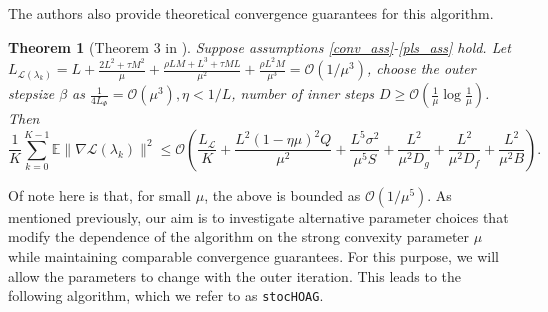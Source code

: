 \documentclass[11pt, twoside]{report}
\newtheorem{theorem}{Theorem}[section]
\begin{document}
\begin{algorithm}[]
\caption{\texttt{stocBio} \cite{ji2021bilevel}}
\label{alg:stocbio}
\DontPrintSemicolon
{}
\end{algorithm}


The authors also provide theoretical convergence guarantees for this algorithm.
\begin{theorem}[Theorem 3 in \cite{ji2021bilevel}] \label{thm3}
    Suppose assumptions \ref{conv_ass}-\ref{pls_ass} hold. Let $L_{\mathcal{L}(\lambda_k)} = L + \frac{2L^2 + \tau M^2}{\mu} + \frac{\rho L M + L^3 + \tau M L}{\mu^2} + \frac{\rho L^2 M}{\mu^3} = \mathcal{O}(1/\mu^3)$, choose the outer stepsize $\beta$ as $\frac{1}{4 L_\Phi} = \mathcal{O}(\mu^3), \eta < 1/L$, number of inner steps $D \geq \mathcal{O}(\frac{1}{\mu} \log{\frac{1}{\mu}})$. Then
    \[\frac{1}{K} \sum_{k=0}^{K-1} \mathbb{E} \|\nabla \mathcal{L}(\lambda_k)\|^2 \leq \mathcal{O}\left( \frac{L_{\mathcal{L}}}{K} + \frac{L^2(1-\eta \mu)^2Q}{\mu^2} + \frac{L^5 \sigma^2}{\mu^5 S} + \frac{L^2}{\mu^2 D_g} + \frac{L^2}{\mu^2 D_f} + \frac{L^2}{
    \mu^2 B} \right).\]
    
\end{theorem}
Of note here is that, for small $\mu$, the above is bounded as $\mathcal{O}(1/\mu^5)$. As mentioned previously, our aim is to investigate alternative parameter choices that modify the dependence of the algorithm on the strong convexity parameter $\mu$ while maintaining comparable convergence guarantees. For this purpose, we will allow the parameters to change with the outer iteration. This leads to the following algorithm, which we refer to as \texttt{stocHOAG}.
\end{document}
